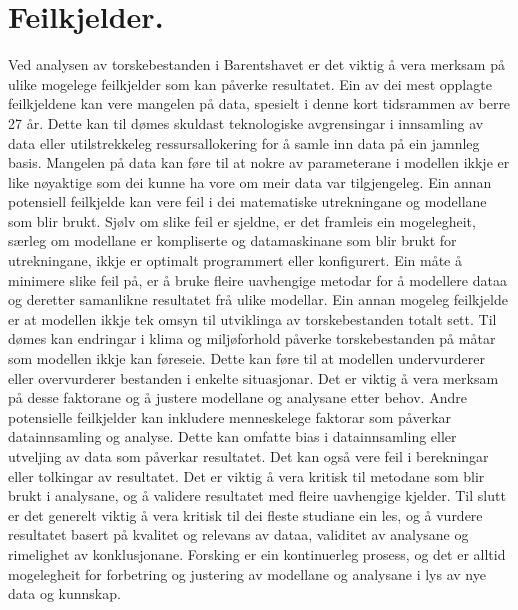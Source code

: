 \documentclass{report}
\begin{document}
\chapter{Feilkjelder.}
Ved analysen av torskebestanden i Barentshavet er det viktig å vera merksam på ulike mogelege feilkjelder som kan påverke resultatet. Ein av dei mest opplagte feilkjeldene kan vere mangelen på data, spesielt i denne kort tidsrammen av berre 27 år. Dette kan til dømes skuldast teknologiske avgrensingar i innsamling av data eller utilstrekkeleg ressursallokering for å samle inn data på ein jamnleg basis. Mangelen på data kan føre til at nokre av parameterane i modellen ikkje er like nøyaktige som dei kunne ha vore om meir data var tilgjengeleg.
Ein annan potensiell feilkjelde kan vere feil i dei matematiske utrekningane og modellane som blir brukt. Sjølv om slike feil er sjeldne, er det framleis ein mogelegheit, særleg om modellane er kompliserte og datamaskinane som blir brukt for utrekningane, ikkje er optimalt programmert eller konfigurert. Ein måte å minimere slike feil på, er å bruke fleire uavhengige metodar for å modellere dataa og deretter samanlikne resultatet frå ulike modellar.
Ein annan mogeleg feilkjelde er at modellen ikkje tek omsyn til utviklinga av torskebestanden totalt sett. Til dømes kan endringar i klima og miljøforhold påverke torskebestanden på måtar som modellen ikkje kan føreseie. Dette kan føre til at modellen undervurderer eller overvurderer bestanden i enkelte situasjonar. Det er viktig å vera merksam på desse faktorane og å justere modellane og analysane etter behov.
Andre potensielle feilkjelder kan inkludere menneskelege faktorar som påverkar datainnsamling og analyse. Dette kan omfatte bias i datainnsamling eller utveljing av data som påverkar resultatet. Det kan også vere feil i berekningar eller tolkingar av resultatet. Det er viktig å vera kritisk til metodane som blir brukt i analysane, og å validere resultatet med fleire uavhengige kjelder.
Til slutt er det generelt viktig å vera kritisk til dei fleste studiane ein les, og å vurdere resultatet basert på kvalitet og relevans av dataa, validitet av analysane og rimelighet av konklusjonane. Forsking er ein kontinuerleg prosess, og det er alltid mogelegheit for forbetring og justering av modellane og analysane i lys av nye data og kunnskap.
\end{document}
